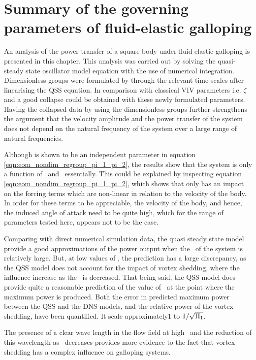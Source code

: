 \section{Summary of the governing parameters of  fluid-elastic galloping}
\label{sec:summary-pi_1-pi_2}

An analysis of the power transfer of a square body under fluid-elastic galloping is presented in this chapter. This analysis was carried out by solving the quasi-steady state oscillator model equation with the use of numerical integration. Dimensionless groups were formulated by through the relevant time scales after linearising the QSS equation. In comparison with classical VIV parameters i.e. $\zeta$ and \ustar a good collapse could be obtained with these newly formulated parameters. Having the collapsed data by using the dimensionless groups further strengthens the argument that the velocity amplitude and the power transfer of the system does not depend on the natural frequency of the system over a large range of natural frequencies.


Although \mstar is shown to be an independent parameter in equation \ref{eqn:eom_nondim_regroup_pi_1_pi_2}, the results show that the system is only a function of \massstiff\ and \massdamp\ essentially. This could be explained by inspecting equation \ref{eqn:eom_nondim_regroup_pi_1_pi_2}, which shows that \mstar only has an impact on the forcing terms which are non-linear in relation to the velocity of the body. In order for these terms to be appreciable, the velocity of the body, and hence, the induced angle of attack need to be quite high, which for the range of parameters tested here, appears not to be the case. 

Comparing with direct numerical simulation data, the quasi steady state model provide a good approximations of the power output when the \massstiff\ of the system is relatively large. But, at low values of \massstiff, the prediction has a large discrepancy, as the QSS model does not account for the impact of vortex shedding, where the influence increase as the \massstiff\ is decreased. That being said, the QSS model does provide quite a reasonable prediction of the value of \massstiff\ at the point where the maximum power is produced. Both the error in predicted maximum power between the QSS and the DNS models, and the relative power of the vortex shedding, have been quantified. It scale approximately1 to $1/\sqrt{\Pi_1}$.

The presence of a clear wave length in the flow field at high \massstiff\ and the reduction of this wavelength as \massstiff\ decreases provides more evidence to the fact that vortex shedding has a complex influence on galloping systems.  





    


